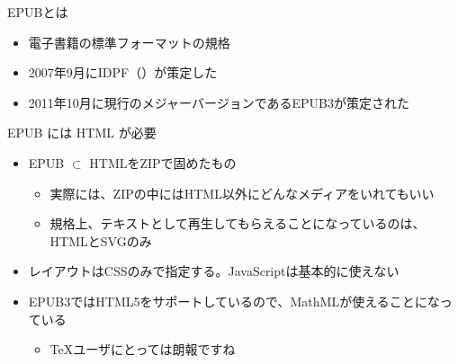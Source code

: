 \begin{frame}[t]{\inhibitglue EPUBとは}
  \sffamily

  \begin{itemize}
    \item 電子書籍の標準フォーマットの規格
    \item 2007年9月にIDPF（）が策定した
    \item 2011年10月に現行のメジャーバージョンであるEPUB3が策定された
  \end{itemize}
\end{frame}

\begin{frame}[t]{\inhibitglue EPUB には HTML が必要}
  \sffamily

  \begin{itemize}
    \item EPUB $\subset $ HTMLをZIPで固めたもの\\
    \begin{itemize}
      \item 実際には、ZIPの中にはHTML以外にどんなメディアをいれてもいい
      \item 規格上、テキストとして再生してもらえることになっているのは、HTMLとSVGのみ
    \end{itemize}
    \item レイアウトはCSSのみで指定する。JavaScriptは基本的に使えない
    \item EPUB3ではHTML5をサポートしているので、MathMLが使えることになっている\\
    \begin{itemize}
      \item \TeX{}ユーザにとっては朗報ですね
    \end{itemize}
  \end{itemize}
  
\end{frame}

